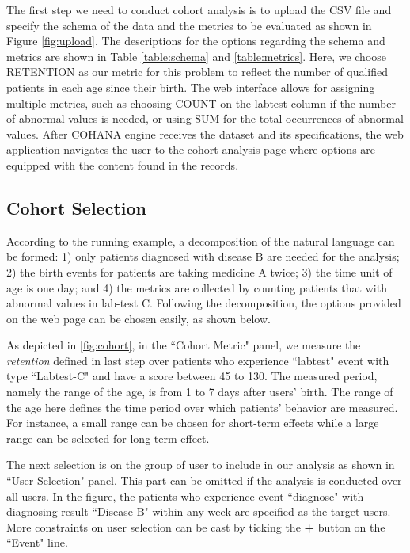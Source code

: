 The first step we need to conduct cohort analysis is to upload the CSV file and specify the schema of the data and the metrics to be evaluated as shown in Figure \ref{fig:upload}. 
The descriptions for the options regarding the schema and metrics are shown in Table \ref{table:schema} and \ref{table:metrics}. 
Here, we choose RETENTION as our metric for this problem to reflect the number of qualified patients in each age since their birth. 
The web interface allows for assigning multiple metrics, such as choosing COUNT on the labtest column if the number of abnormal values is needed, or using SUM for the total occurrences of abnormal values. 
After COHANA engine receives the dataset and its specifications, the web application navigates the user to the cohort analysis page where options are equipped with the content found in the records.

\subsection{Cohort Selection}

According to the running example, a decomposition of the natural language can be formed: 1) only patients diagnosed with disease B are needed for the analysis; 2) the birth events for patients are taking medicine A twice; 3) the time unit of age is one day; and 4) the metrics are collected by counting patients that with abnormal values in lab-test C. 
Following the decomposition, the options provided on the web page can be chosen easily, as shown below.

As depicted in \ref{fig:cohort}, in the ``Cohort Metric" panel, we measure the \emph{retention} defined in last step over patients who experience ``labtest" event with type ``Labtest-C" and have a score between 45 to 130. 
The measured period, namely the range of the age, is from 1 to 7 days after users' birth.
The range of the age here defines the time period over which patients' behavior are measured. For instance, a small range can be chosen for short-term effects while a large range can be selected for long-term effect.

The next selection is on the group of user to include in our analysis as shown in ``User Selection" panel. This part can be omitted if the analysis is conducted over all users. 
In the figure, the patients who experience event ``diagnose" with diagnosing result ``Disease-B" within any week are specified as the target users.
More constraints on user selection can be cast by ticking the \textbf{+} button on the ``Event" line.

